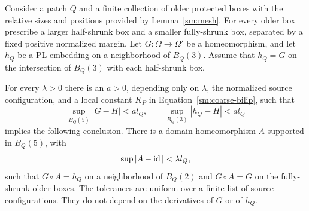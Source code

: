 \begin{lemma}
\label{sm:insertion}
Consider a patch $Q$ and a finite collection of older protected
boxes with the relative sizes and positions provided by
Lemma~\ref{sm:mesh}.  For every older box prescribe a larger
half-shrunk box and a smaller fully-shrunk box, separated by a
fixed positive normalized margin.  Let $G:\Omega\to\Omega'$ be
a homeomorphism, and let $h_Q$ be a PL embedding on a neighborhood
of $B_Q(3)$.  Assume that $h_Q=G$ on the intersection of
$B_Q(3)$ with each half-shrunk box.

For every $\lambda>0$ there is an $a>0$, depending only on
$\lambda$, the normalized source configuration, and a local
constant $K_P$ in Equation~\eqref{sm:coarse-bilip}, such that
\begin{equation}
 \label{sm:insertion-smallness}
 \sup_{B_Q(5)}|G-H|<a l_Q,
 \qquad \sup_{B_Q(3)}|h_Q-H|<a l_Q
\end{equation}
implies the following conclusion.  There is a domain
homeomorphism $A$ supported in $B_Q(5)$, with
\[
 \sup|A-\operatorname{id}|<\lambda l_Q,
\]
such that $G\circ A=h_Q$ on a neighborhood of $B_Q(2)$ and
$G\circ A=G$ on the fully-shrunk older boxes.  The tolerances
are uniform over a finite list of source configurations.  They
do not depend on the derivatives of $G$ or of $h_Q$.
\end{lemma}

